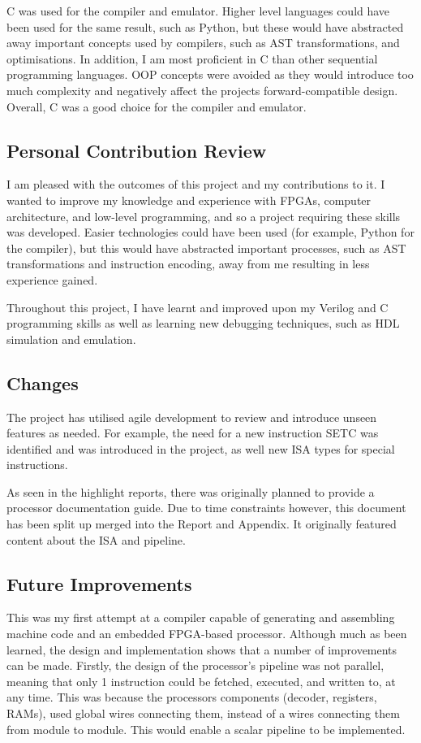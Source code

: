 \documentclass[11pt,a4paper]{report}
\begin{document}
C was used for the compiler and emulator. Higher level languages could have been used for the same result, such as Python, but these would have abstracted away important concepts used by compilers, such as AST transformations, and optimisations. In addition, I am most proficient in C than other sequential programming languages. OOP concepts were avoided as they would introduce too much complexity and negatively affect the projects forward-compatible design. Overall, C was a good choice for the compiler and emulator.

\subsection*{Personal Contribution Review}
I am pleased with the outcomes of this project and my contributions to it. I wanted to improve my knowledge and experience with FPGAs, computer architecture, and low-level programming, and so a project requiring these skills was developed. Easier technologies could have been used (for example, Python for the compiler), but this would have abstracted important processes, such as AST transformations and instruction encoding, away from me resulting in less experience gained.

Throughout this project, I have learnt and improved upon my Verilog and C programming skills as well as learning new debugging techniques, such as HDL simulation and emulation.

\subsection*{Changes}
The project has utilised agile development to review and introduce unseen features as needed. For example, the need for a new instruction SETC was identified and was introduced in the project, as well new ISA types for special instructions. 

As seen in the highlight reports, there was originally planned to provide a processor documentation guide. Due to time constraints however, this document has been split up merged into the Report and Appendix. It originally featured content about the ISA and pipeline.


\subsection*{Future Improvements}
This was my first attempt at a compiler capable of generating and assembling machine code and an embedded FPGA-based processor. Although much as been learned, the design and implementation shows that a number of improvements can be made. Firstly, the design of the processor's pipeline was not parallel, meaning that only 1 instruction could be fetched, executed, and written to, at any time. This was because the processors components (decoder, registers, RAMs), used global wires connecting them, instead of a wires connecting them from module to module. This would enable a scalar pipeline to be implemented.
\end{document}
